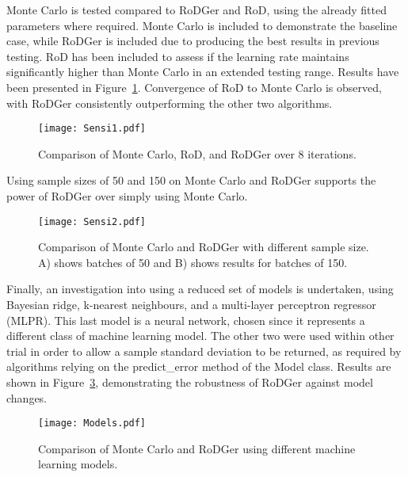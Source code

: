 Monte Carlo is tested compared to RoDGer and RoD, using the already fitted parameters where required. Monte Carlo is included to demonstrate the baseline case, while RoDGer is included due to producing the best results in previous testing. RoD has been included to assess if the learning rate maintains significantly higher than Monte Carlo in an extended testing range. Results have been presented in Figure~\ref{fig:sensi1}. Convergence of RoD to Monte Carlo is observed, with RoDGer consistently outperforming the other two algorithms.

\begin{figure}[H]
    \begin{center}
        \texttt{[image: Sensi1.pdf]}
        \caption[Results of Prolonged Sampling]{Comparison of Monte Carlo, RoD, and RoDGer over 8 iterations.}
        \label{fig:sensi1}
    \end{center}
\end{figure}

Using sample sizes of 50 and 150 on Monte Carlo and RoDGer supports the power of RoDGer over simply using Monte Carlo.

\begin{figure}[H]
    \begin{center}
        \texttt{[image: Sensi2.pdf]}
        \caption[Results of Different Sample Sizes]{Comparison of Monte Carlo and RoDGer with different sample size. A) shows batches of 50 and B) shows results for batches of 150.}
        \label{fig:sensi2}
    \end{center}
\end{figure}

Finally, an investigation into using a reduced set of models is undertaken, using Bayesian ridge, k-nearest neighbours, and a multi-layer perceptron regressor (MLPR). This last model is a neural network, chosen since it represents a different class of machine learning model. The other two were used within other trial in order to allow a sample standard deviation to be returned, as required by algorithms relying on the predict\_error method of the Model class. Results are shown in Figure~\ref{fig:modelSensi}, demonstrating the robustness of RoDGer against model changes.

\begin{figure}[H]
    \begin{center}
        \texttt{[image: Models.pdf]}
        \caption[Sensitivity to Model Selection]{Comparison of Monte Carlo and RoDGer using different machine learning models.}
        \label{fig:modelSensi}
    \end{center}
\end{figure}


